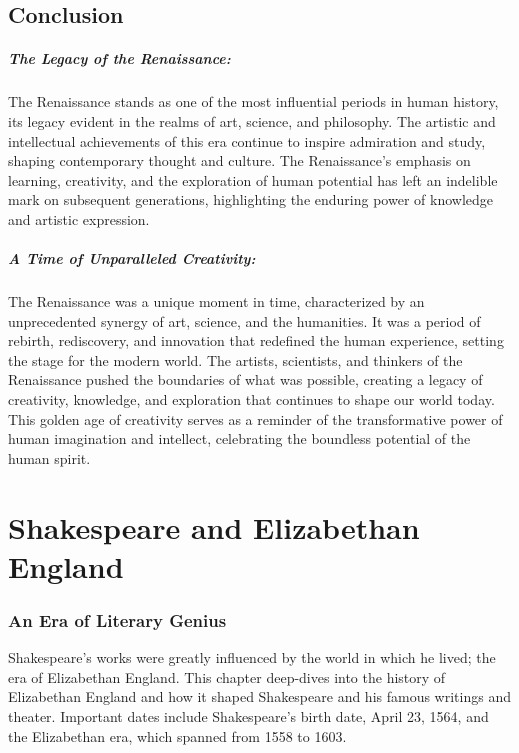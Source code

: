 \documentclass[a4paper,12pt]{book}
\begin{document}
\section*{Conclusion}

\paragraph{The Legacy of the Renaissance:}
The Renaissance stands as one of the most influential periods in human history, its legacy evident in the realms of art, science, and philosophy. The artistic and intellectual achievements of this era continue to inspire admiration and study, shaping contemporary thought and culture. The Renaissance’s emphasis on learning, creativity, and the exploration of human potential has left an indelible mark on subsequent generations, highlighting the enduring power of knowledge and artistic expression.

\paragraph{A Time of Unparalleled Creativity:}
The Renaissance was a unique moment in time, characterized by an unprecedented synergy of art, science, and the humanities. It was a period of rebirth, rediscovery, and innovation that redefined the human experience, setting the stage for the modern world. The artists, scientists, and thinkers of the Renaissance pushed the boundaries of what was possible, creating a legacy of creativity, knowledge, and exploration that continues to shape our world today. This golden age of creativity serves as a reminder of the transformative power of human imagination and intellect, celebrating the boundless potential of the human spirit.




\chapter{Shakespeare and Elizabethan England}
\subsection*{An Era of Literary Genius}
Shakespeare's works were greatly influenced by the world in which he lived; the era of Elizabethan England. This chapter deep-dives into the history of Elizabethan England and how it shaped Shakespeare and his famous writings and theater. Important dates include Shakespeare's birth date, April 23, 1564, and the Elizabethan era, which spanned from 1558 to 1603.
\end{document}
